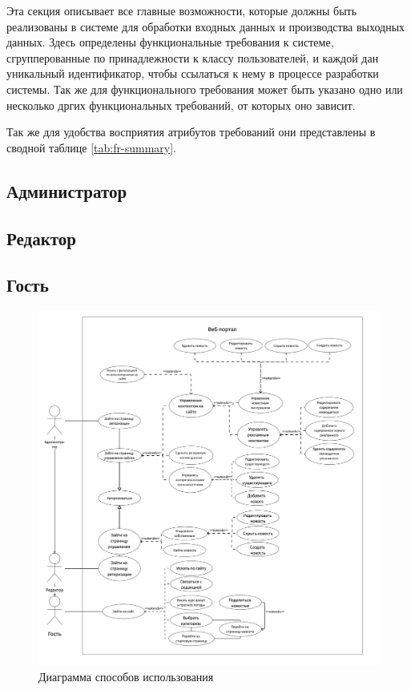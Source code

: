 
    
Эта секция описывает все главные возможности, которые должны быть реализованы в системе для обработки входных данных и производства выходных данных. Здесь определены функциональные требования к системе, сгрупперованные по принадлежности к классу пользователей, и каждой дан уникальный идентификатор, чтобы ссылаться к нему в процессе разработки системы. Так же для функционального требования может быть указано одно или несколько дргих функциональных требований, от которых оно зависит. 

Так же для удобства восприятия атрибутов требований они представлены в сводной таблице \ref{tab:fr-summary}.

\subsection{Администратор}


\subsection{Редактор}


\subsection{Гость}



\begin{figure}
    \centering
    \includegraphics[width=0.85\paperwidth]{res/functional-requirements.png}
    \caption{Диаграмма способов использования}
    \label{fig:use-case-diagram}
\end{figure}

